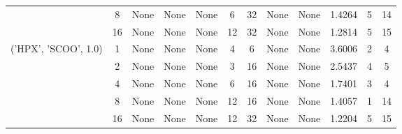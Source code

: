 \begin{tabular}{cccccccccccc}
& 8& None& None& None& 6& 32& None& None& 1.4264& 5& 14\\
& 16& None& None& None& 12& 32& None& None& 1.2814& 5& 15\\
\hline
\multirow{5}{*}{('HPX', 'SCOO', 1.0)}& 1& None& None& None& 4& 6& None& None& 3.6006& 2& 4\\
& 2& None& None& None& 3& 16& None& None& 2.5437& 4& 5\\
& 4& None& None& None& 6& 16& None& None& 1.7401& 3& 4\\
& 8& None& None& None& 12& 16& None& None& 1.4057& 1& 14\\
& 16& None& None& None& 12& 32& None& None& 1.2204& 5& 15\\
\hline
\end{tabular}



